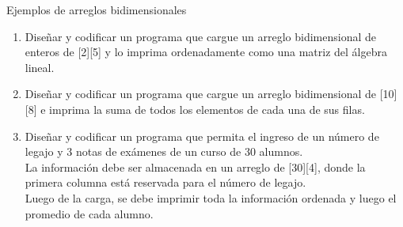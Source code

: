 \documentclass[xcolor=pdftex,table,11pt]{beamer}
\begin{document}
\begin{frame}{Ejemplos de arreglos bidimensionales}
 \begin{enumerate}
   
        \item Diseñar y codificar un programa que cargue un arreglo bidimensional de enteros de [2][5] y lo imprima ordenadamente como una matriz del álgebra lineal.
\href{https://github.com/danis963/informaticaI_IUA/blob/main/c/src/8-3arrays.c}{}

        \item Diseñar y codificar un programa que cargue un arreglo bidimensional de [10][8] e imprima la suma de todos los elementos de cada una de sus filas.
                
\href{https://github.com/danis963/informaticaI_IUA/blob/main/c/src/5-break_cont_1.c}{}


        \item Diseñar y codificar un programa que permita el ingreso de un número de legajo y 3 notas de exámenes de un curso de 30 alumnos. \\
        La información debe ser almacenada en un arreglo de [30][4], donde la primera columna está reservada para el número de legajo.\\
        Luego de la carga, se debe imprimir toda la información ordenada y luego el promedio de cada alumno.
\href{https://github.com/danis963/informaticaI_IUA/blob/main/c/src/5-break_cont_1.c}{}

   \end{enumerate}

 
\end{frame}
\end{document}
